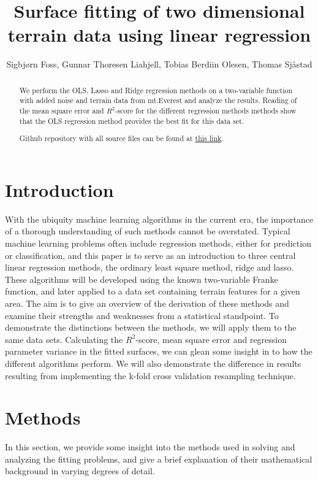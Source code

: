 \documentclass{emulateapj}
\begin{document}
\title{Surface fitting of two dimensional terrain data using linear regression}


\author{Sigbjørn Foss, Gunnar Thoresen Liahjell, Tobias Berdiin Olesen, Thomas Sjåstad}



\begin{abstract}
  We perform the OLS, Lasso and Ridge regression methods on a two-variable function with added noise and terrain data from mt.Everest and analyze the results. Reading of the mean square error and $R^2$-score for the different regression methods methods show that the OLS regression method provides the best fit for this data set.
  
  Github repository with all source files can be found at  \href{https://github.com/gunnartl/fys-stk4155/tree/master/project1}{this link}.
\end{abstract}

\section{Introduction}
With the ubiquity machine learning algorithms in the current era, the importance of a thorough understanding of such methods cannot be overstated. Typical machine learning problems often include regression methods, either for prediction or classification, and this paper is to serve as an introduction to three central linear regression methods, the ordinary least square method, ridge and lasso. These algorithms will be developed using the known two-variable Franke function, and later applied to a data set containing terrain features for a given area. The aim is to give an overview of the derivation of these methods and examine their strengths and weaknesses from a statistical standpoint. To demonstrate the distinctions between the methods, we will apply them to the same data sets. Calculating the $R^2$-score, mean square error and regression parameter variance in the fitted surfaces, we can glean some insight in to how the different algorithms perform. We will also demonstrate the difference in results resulting from implementing the k-fold cross validation resampling technique.   



\section{Methods}
In this section, we provide some insight into the methods used in solving and analyzing the fitting problems, and give a brief explanation of their mathematical background in varying degrees of detail.  
\end{document}
